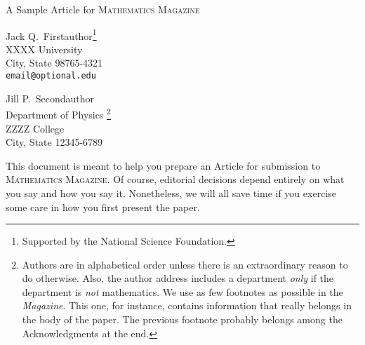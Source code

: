 \documentclass[12pt]{article}
\begin{document}
\begin{center}
\Large
A Sample Article for  \textsc{ Mathematics Magazine}
\end{center}

\begin{flushright}
Jack Q.~Firstauthor\footnote{Supported by the National Science
Foundation.}  \\
XXXX University \\
City, State 98765-4321\\
\verb+email@optional.edu+

\vspace{2 mm}

Jill P.~Secondauthor \\
Department of Physics
\footnote{Authors are in alphabetical order
unless there is an extraordinary reason to do otherwise.  Also,
the author address includes a department \emph{only} if
the department is \emph{not} mathematics. We use as few
footnotes as possible in the \textit{Magazine}.  This one, for instance,
contains information that really belongs in the body of the paper.
The previous footnote probably belongs among the Acknowledgments at the end.}\\
ZZZZ College \\
City, State 12345-6789
\end{flushright}

This document is meant to help you prepare an Article for
submission to \textsc{Mathematics Magazine}.  Of course,
editorial decisions depend entirely on
what you say and how you say it. Nonetheless, we will all save
time if you exercise some care in how you first present the paper.\cite{adams1995hitchhiker}



\end{document}
